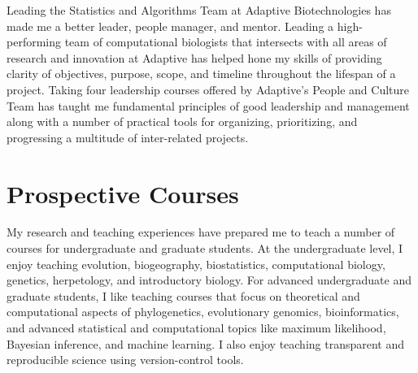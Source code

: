 Leading the Statistics and Algorithms Team at Adaptive Biotechnologies has made
me a better leader, people manager, and mentor.
Leading a high-performing team of computational biologists that intersects with
all areas of research and innovation at Adaptive has helped hone my skills of
providing clarity of objectives, purpose, scope, and timeline throughout the
lifespan of a project.
Taking four leadership courses offered by Adaptive's People and Culture Team
has taught me fundamental principles of good leadership and management along
with a number of practical tools for organizing, prioritizing, and progressing
a multitude of inter-related projects.


\section*{Prospective Courses}


My research and teaching experiences have prepared me to teach a number of
courses for undergraduate and graduate students.
At the undergraduate level, I enjoy teaching
evolution,
biogeography,
biostatistics,
computational biology,
genetics,
herpetology,
and
introductory biology.
For advanced undergraduate and graduate students, I like teaching courses
that focus on theoretical and computational aspects of
phylogenetics,
evolutionary genomics,
bioinformatics,
and
advanced statistical and computational topics like
maximum likelihood,
Bayesian inference,
and
machine learning.
I also enjoy teaching transparent and reproducible science using version-control tools.

